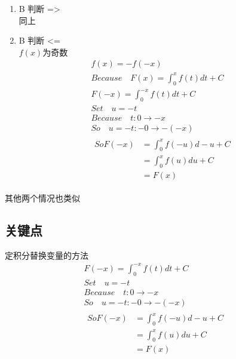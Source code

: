 \documentclass[a4paper]{ctexart}
\begin{document}
\begin{multicols}{2}
\begin{enumerate}
        \item B \quad 判断 => \\
        同上\\
        \item B \quad 判断 <=\\
        $f(x)$为奇数
        $$
        \begin{array}{l}
        f(x) = -f(-x)\\
        Because \quad F(x) = \int_{0}^{x}{f(t)dt} + C\\
        F(-x) = \int_{0}^{-x}{f(t)dt} + C\\
        Set \quad u = -t\\
        Because \quad t: 0 \rightarrow -x\\
        So \quad u=-t: -0 \rightarrow -(-x)\\
            \begin{array}{ll}
            So F(-x) & = \int_{0}^{x}{f(-u)d-u} + C\\
                     & = \int_{0}^{x}{f(u)du} + C\\
                     & = F(x)
            \end{array}
        \end{array}
        $$
    \end{enumerate}
    其他两个情况也类似
    \subsection{关键点}
    定积分替换变量的方法
    $$
    \begin{array}{l}
    F(-x) = \int_{0}^{-x}{f(t)dt} + C\\
    Set \quad u = -t\\
    Because \quad t: 0 \rightarrow -x\\
    So \quad u=-t: -0 \rightarrow -(-x)\\
        \begin{array}{ll}
        So F(-x) & = \int_{0}^{x}{f(-u)d-u} + C\\
                 & = \int_{0}^{x}{f(u)du} + C\\
                 & = F(x)
        \end{array}
    \end{array}
    $$


    

\end{multicols}
\end{document}
